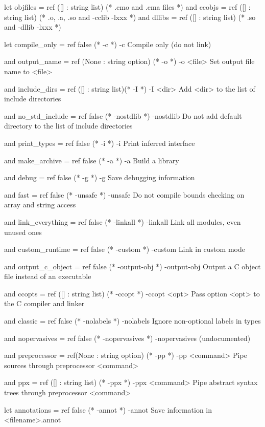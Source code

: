 \begin{bashcode}
let objfiles = ref ([] : string list)   (* .cmo and .cma files *)
and ccobjs = ref ([] : string list)     (* .o, .a, .so and -cclib -lxxx *)
and dllibs = ref ([] : string list)     (* .so and -dllib -lxxx *)

let compile_only = ref false            (* -c *)
-c  Compile only (do not link)


and output_name = ref (None : string option) (* -o *)
-o <file>  Set output file name to <file>


and include_dirs = ref ([] : string list)(* -I *)
-I <dir>  Add <dir> to the list of include directories


and no_std_include = ref false          (* -nostdlib *)
-nostdlib  Do not add default directory to the list of include directories


and print_types = ref false             (* -i *)
-i  Print inferred interface

and make_archive = ref false            (* -a *)
-a  Build a library


and debug = ref false                   (* -g *)
-g  Save debugging information

and fast = ref false                    (* -unsafe *)
-unsafe  Do not compile bounds checking on array and string access

and link_everything = ref false         (* -linkall *)
-linkall  Link all modules, even unused ones

and custom_runtime = ref false          (* -custom *)
-custom  Link in custom mode

and output_c_object = ref false         (* -output-obj *)
-output-obj  Output a C object file instead of an executable

and ccopts = ref ([] : string list)     (* -ccopt *)
-ccopt <opt>  Pass option <opt> to the C compiler and linker

and classic = ref false                 (* -nolabels *)
-nolabels  Ignore non-optional labels in types

and nopervasives = ref false            (* -nopervasives *)
-nopervasives  (undocumented)

and preprocessor = ref(None : string option) (* -pp *)
-pp <command>  Pipe sources through preprocessor <command>

and ppx = ref ([] : string list)        (* -ppx *)
-ppx <command>  Pipe abstract syntax trees through preprocessor <command>

let annotations = ref false             (* -annot *)
-annot  Save information in <filename>.annot


\end{bashcode}
